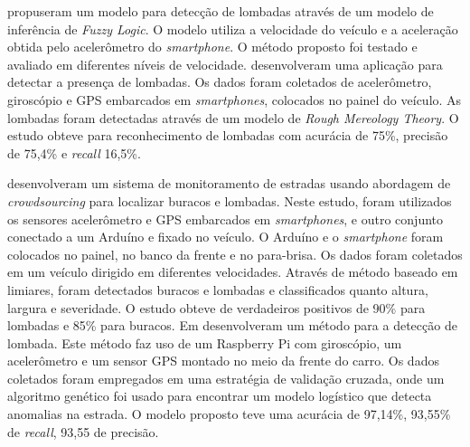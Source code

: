 \cite{Aljaafreh2017} propuseram um modelo para detecção de lombadas através de um modelo de inferência de \textit{Fuzzy Logic}. O modelo utiliza a velocidade do veículo e a aceleração obtida pelo acelerômetro do \textit{smartphone}. O método proposto foi testado e avaliado em diferentes níveis de velocidade. \cite{Fouad2014} desenvolveram uma aplicação para detectar a presença de lombadas. Os dados foram coletados de acelerômetro, giroscópio e GPS embarcados em \textit{smartphones}, colocados no painel do veículo. As lombadas foram detectadas através de um modelo de \textit{Rough Mereology Theory}. O estudo obteve para reconhecimento de lombadas com acurácia de 75\%, precisão de 75,4\% e \textit{recall} 16,5\%.

\cite{Sabir2019} desenvolveram um sistema de monitoramento de estradas usando abordagem de \textit{crowdsourcing} para localizar buracos e lombadas. Neste estudo, foram utilizados os sensores acelerômetro e GPS embarcados em \textit{smartphones}, e outro conjunto conectado a um Arduíno e fixado no veículo. O Arduíno e o \textit{smartphone} foram colocados no painel, no banco da frente e no para-brisa. Os dados foram coletados em um veículo dirigido em diferentes velocidades. Através de método baseado em limiares, foram detectados buracos e lombadas e classificados quanto altura, largura e severidade. O estudo obteve de verdadeiros positivos de 90\% para lombadas e 85\% para buracos. Em \cite{Padilla2018} desenvolveram um método para a detecção de lombada. Este método faz uso de um Raspberry Pi com giroscópio, um acelerômetro e um sensor GPS montado no meio da frente do carro. Os dados coletados foram empregados em uma estratégia de validação cruzada, onde um algoritmo genético foi usado para encontrar um modelo logístico que detecta anomalias na estrada. O modelo proposto teve uma acurácia de 97,14\%, 93,55\% de \textit{recall}, 93,55 de precisão.

